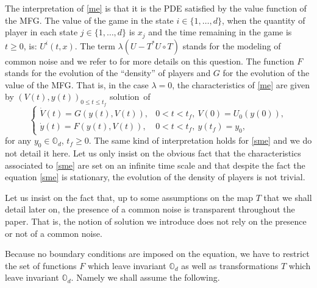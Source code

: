 \documentclass[10pt]{amsart}
\theoremstyle{definition}
\begin{document}
The interpretation of \eqref{me} is that it is the PDE satisfied by the value function of the MFG. The value of the game in the state $i\in \{1,\dots,d\}$, when the quantity of player in each state $j \in \{1,\dots,d\}$ is $x_j$ and the time remaining in the game is $t\geq 0$, is: $U^i(t,x)$. The term $\lambda(U-T^* U\circ T)$ stands for the modeling of common noise and we refer to \cite{bertucci2019some} for more details on this question. The function $F$ stands for the evolution of the ``density'' of players and $G$ for the evolution of the value of the MFG. That is, in the case $\lambda = 0$, the characteristics of \eqref{me} are given by $(V(t), y(t))_{0\leq t \leq t_f}$ solution~of%
\begin{equation}\label{char}
\begin{cases}
\dot{V}(t) = G(y(t),V(t)),& 0 < t < t_f ,\ V(0) = U_0(y(0)),\\
\dot{y}(t) = F(y(t),V(t)),& 0<t<t_f,\ y(t_f) = y_0,
\end{cases}
\end{equation}
for any $y_0 \in \mathbb{O}_d$, $t_f \geq 0$. The same kind of interpretation holds for \eqref{sme} and we do not detail it here. Let us only insist on the obvious fact that the characteristics associated to \eqref{sme} are set on an infinite time scale and that despite the fact the equation \eqref{sme} is stationary, the evolution of the density of players is not trivial.

Let us insist on the fact that, up to some assumptions on the map $T$ that we shall detail later on, the presence of a common noise is transparent throughout the paper. That is, the notion of solution we introduce does not rely on the presence or not of a common noise.

Because no boundary conditions are imposed on the equation, we have to restrict the set of functions $F$ which leave invariant $\mathbb{O}_d$ as well as transformations $T$ which leave invariant $\mathbb{O}_d$. Namely we shall assume the following.
\end{document}
